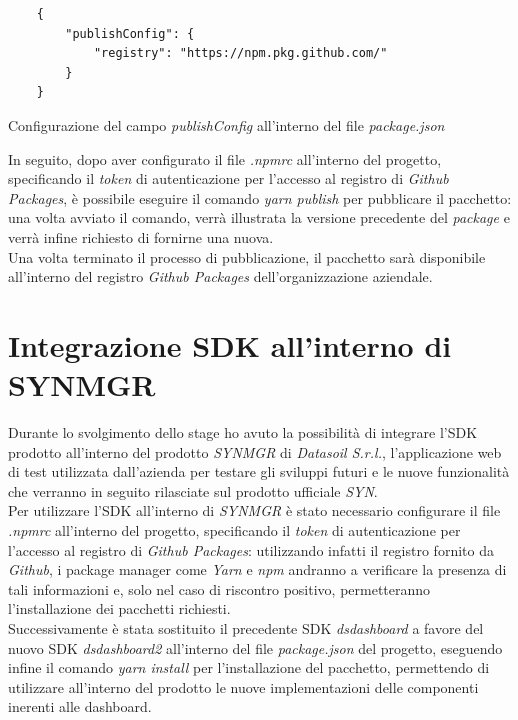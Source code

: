 \begin{listing}[H]
    \begin{verbatim}
    {
        "publishConfig": {
            "registry": "https://npm.pkg.github.com/"
        }
    }
    \end{verbatim}
    \caption{Configurazione del campo \textit{publishConfig} all'interno del file \textit{package.json}}
    \label{listing:package_json_publish_config}
\end{listing}

In seguito, dopo aver configurato il file \textit{.npmrc} all'interno del progetto, specificando il \textit{token} di autenticazione per l'accesso al registro di \textit{Github Packages},
è possibile eseguire il comando \textit{yarn publish} per pubblicare il pacchetto: una volta avviato il comando, verrà illustrata la versione precedente del
\textit{package} e verrà infine richiesto di fornirne una nuova. \\
Una volta terminato il processo di pubblicazione, il pacchetto sarà disponibile all'interno del registro \textit{Github Packages} dell'organizzazione aziendale.

\section{Integrazione SDK all'interno di SYNMGR}
Durante lo svolgimento dello stage ho avuto la possibilità di integrare l'SDK prodotto all'interno del prodotto \textit{SYNMGR} di \textit{Datasoil S.r.l.},
l'applicazione web di test utilizzata dall'azienda per testare gli sviluppi futuri e le nuove funzionalità che verranno in seguito rilasciate sul prodotto ufficiale \textit{SYN}. \\
Per utilizzare l'SDK all'interno di \textit{SYNMGR} è stato necessario configurare il file \textit{.npmrc} all'interno del progetto, specificando il \textit{token} di autenticazione
per l'accesso al registro di \textit{Github Packages}: utilizzando infatti il registro fornito da \textit{Github}, i package manager come \textit{Yarn} e \textit{npm} andranno
a verificare la presenza di tali informazioni e, solo nel caso di riscontro positivo, permetteranno l'installazione dei pacchetti richiesti. \\
Successivamente è stata sostituito il precedente SDK \textit{dsdashboard} a favore del nuovo SDK \textit{dsdashboard2} all'interno del file \textit{package.json} del progetto,
eseguendo infine il comando \textit{yarn install} per l'installazione del pacchetto, permettendo di utilizzare all'interno del prodotto le nuove implementazioni
delle componenti inerenti alle dashboard.


